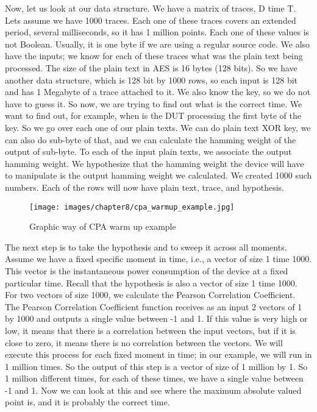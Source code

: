 Now, let us look at our data structure. We have a matrix of traces, D time T.
Lets assume we have 1000 traces. Each one of these traces covers an extended period, several milliseconds, so it has 1 million points. Each one of these values
is not Boolean. Usually, it is one byte if we are using a regular source code. We
also have the inputs; we know for each of these traces what was the plain
text being processed. The size of the plain text in AES is 16 bytes (128 bits).
So we have another data structure, which is 128 bit by 1000 rows, so each input
is 128 bit and has 1 Megabyte of a trace attached to it. We also know the key, so we
do not have to guess it. So now, we are trying to find out what is the correct
time. We want to find out, for example, when is the DUT processing the first byte
of the key. So we go over each one of our plain texts. We can do plain text XOR
key, we can also do sub-byte of that, and we can calculate the hamming weight of the output
of sub-byte. To each of the input plain texts, we associate the output hamming
weight. We hypothesize that the hamming weight the device will have to
manipulate is the output hamming weight we calculated. We created 1000 such
numbers. Each of the rows will now have plain text, trace, and hypothesis.

\begin{figure}[!ht]
    \centering
    \texttt{[image: images/chapter8/cpa\_warmup\_example.jpg]}
    \caption{Graphic way of CPA warm up example} \label{c8_cpa_warmup_example:fig}
\end{figure}

The next step is to take the hypothesis and to sweep it across all moments. Assume we have a fixed specific moment in time, i.e., a vector of size 1
time 1000. This vector is the instantaneous power consumption of the device at
a fixed particular time. Recall that the hypothesis is also a vector of size 1
time 1000. For two vectors of size 1000, we calculate the Pearson Correlation
Coefficient. The Pearson Correlation Coefficient function receives as an input 2
vectors of 1 by 1000 and outputs a single value between -1 and 1. If this value
is very high or low, it means that there is a correlation between the input
vectors, but if it is close to zero, it means there is no correlation between the
vectors. We will execute this process for each fixed moment in time; in our
example, we will run in 1 million times. So the output of this step is a vector
of size of 1 million by 1. So 1 million different times, for each of these
times, we have a single value between -1 and 1. Now we can look at this and see
where the maximum absolute valued point is, and it is probably the correct time.

